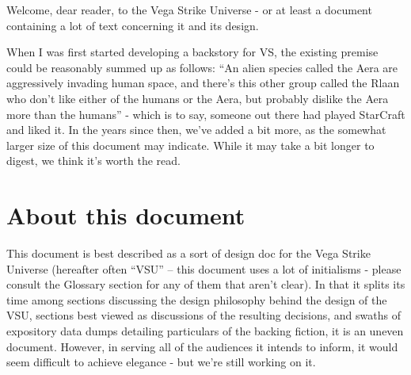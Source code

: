 Welcome, dear reader, to the Vega Strike Universe - or at least a
document containing a lot of text concerning it and its design.

When I was first started developing a backstory for VS, the existing
premise could be reasonably summed up as follows: ``An alien species
called the Aera are aggressively invading human space, and there's
this other group called the Rlaan who don't like either of the humans
or the Aera, but probably dislike the Aera more than the humans'' -
which is to say, someone out there had played StarCraft and liked
it. In the years since then, we've added a bit more, as the somewhat
larger size of this document may indicate. While it may take a bit
longer to digest, we think it's worth the read.

\section*{About this document}
This document is best described as a sort of design doc for the Vega
Strike Universe (hereafter often ``VSU'' -- this document uses a lot
of initialisms - please consult the Glossary section for any of them
that aren't clear). In that it splits its time among sections
discussing the design philosophy behind the design of the VSU,
sections best viewed as discussions of the resulting decisions, and
swaths of expository data dumps detailing particulars of the backing
fiction, it is an uneven document. However, in serving all of the
audiences it intends to inform, it would seem difficult to achieve
elegance - but we're still working on it.

